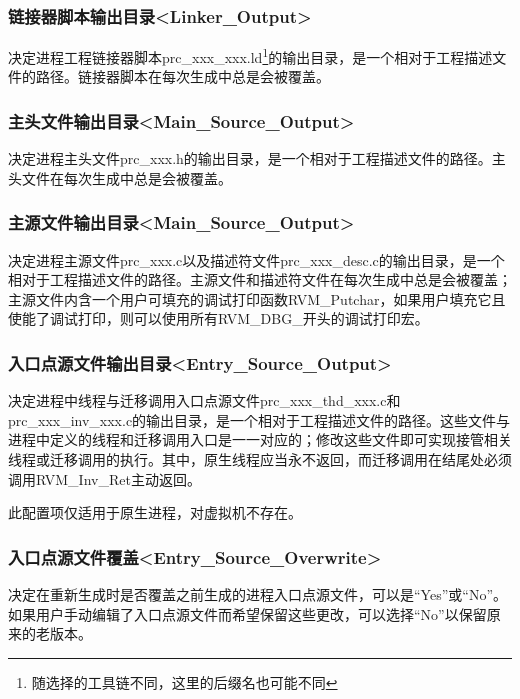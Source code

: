 \subsubsection{链接器脚本输出目录<Linker\_Output>{}}\label{subsubsec:5-3-14-9}

决定进程工程链接器脚本prc\_xxx\_xxx.ld\footnote{随选择的工具链不同，这里的后缀名也可能不同}的输出目录，是一个相对于工程描述文件的路径。链接器脚本在每次生成中总是会被覆盖。

\subsubsection{主头文件输出目录<Main\_Source\_Output>{}}\label{subsubsec:5-3-14-10}

决定进程主头文件prc\_xxx.h的输出目录，是一个相对于工程描述文件的路径。主头文件在每次生成中总是会被覆盖。

\subsubsection{主源文件输出目录<Main\_Source\_Output>{}}\label{subsubsec:5-3-14-11}

决定进程主源文件prc\_xxx.c以及描述符文件prc\_xxx\_desc.c的输出目录，是一个相对于工程描述文件的路径。主源文件和描述符文件在每次生成中总是会被覆盖；主源文件内含一个用户可填充的调试打印函数RVM\_Putchar，如果用户填充它且使能了调试打印，则可以使用所有RVM\_DBG\_开头的调试打印宏。

\subsubsection{入口点源文件输出目录<Entry\_Source\_Output>{}}\label{subsubsec:5-3-14-12}

决定进程中线程与迁移调用入口点源文件prc\_xxx\_thd\_xxx.c和prc\_xxx\_inv\_xxx.c的输出目录，是一个相对于工程描述文件的路径。这些文件与进程中定义的线程和迁移调用入口是一一对应的；修改这些文件即可实现接管相关线程或迁移调用的执行。其中，原生线程应当永不返回，而迁移调用在结尾处必须调用RVM\_Inv\_Ret主动返回。

此配置项仅适用于原生进程，对虚拟机不存在。

\subsubsection{入口点源文件覆盖<Entry\_Source\_Overwrite>{}}\label{subsubsec:5-3-14-13}

决定在重新生成时是否覆盖之前生成的进程入口点源文件，可以是``Yes''或``No''。如果用户手动编辑了入口点源文件而希望保留这些更改，可以选择``No''以保留原来的老版本。

